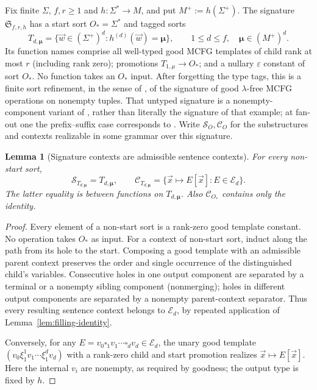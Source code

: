 \documentclass[11pt]{article}
\numberwithin{equation}{section}
\theoremstyle{plain}
\newtheorem{lemma}[theorem]{Lemma}
\theoremstyle{definition}
\theoremstyle{remark}
\newcommand{\tuple}[1]{\vec{#1}}
\newcommand{\blank}{\square}
\newcommand{\eps}{\varepsilon}
\theoremstyle{plain}
\begin{document}
Fix finite $\Sigma$, $f,r\ge1$ and
$h:\Sigma^*\to M$, and put $M^+:=h(\Sigma^+)$.
The signature $\mathfrak S_{f,r,h}$ has a
start sort $O_*=\Sigma^*$ and tagged sorts
\[
 T_{d,\boldsymbol\mu}
 =\{\tuple w\in(\Sigma^+)^d:
 h^{(d)}(\tuple w)=\boldsymbol\mu\},
 \qquad
 1\le d\le f,\quad\boldsymbol\mu\in(M^+)^d.
\]
Its function names comprise all well-typed
good MCFG templates of child rank at most $r$
(including rank zero); promotions
$T_{1,\mu}\to O_*$; and a nullary $\eps$
constant of sort $O_*$. No function takes an
$O_*$ input. After forgetting the type tags, this is a
finite sort refinement, in the sense of
\cite[Section~8]{Yoshinaka2015General}, of
the signature of good $\lambda$-free MCFG
operations on nonempty tuples. That
untyped signature is a nonempty-component
variant of \cite[Example~3]{Yoshinaka2015General},
rather than literally the signature of that
example; at fan-out one the prefix--suffix
case corresponds to
\cite[Example~4]{Yoshinaka2015General}.
Write $\mathcal S_O,\mathcal C_O$ for the
substructures and contexts realizable in
some grammar over this signature.

\begin{lemma}[Signature contexts are admissible sentence contexts]
\label{lem:signature-contexts}
For every non-start sort,
\[
 \mathcal S_{T_{d,\boldsymbol\mu}}
 =T_{d,\boldsymbol\mu},
 \qquad
 \mathcal C_{T_{d,\boldsymbol\mu}}
 =\{\tuple x\mapsto E[\tuple x]:E\in\mathcal E_d\}.
\]
The latter equality is between \emph{functions}
on $T_{d,\boldsymbol\mu}$.
Also $\mathcal C_{O_*}$ contains only the identity.
\end{lemma}

\begin{proof}
Every element of a non-start sort is a rank-zero
good template constant. No operation takes
$O_*$ as input. For a context of non-start
sort, induct along the path from its hole
to the start. Composing a good template with
an admissible parent context preserves the
order and single occurrence of the
distinguished child's variables.
Consecutive holes in one output component
are separated by a terminal or a nonempty
sibling component (nonmerging); holes in
different output components are separated
by a nonempty parent-context separator.
Thus every resulting sentence context
belongs to $\mathcal E_d$, by repeated
application of Lemma~\ref{lem:filling-identity}.

Conversely, for any
$E=v_0\blank_1v_1\cdots\blank_dv_d
\in\mathcal E_d$, the unary good template
$(v_0\xi_1^1v_1\cdots\xi_1^dv_d)$
with a rank-zero child and start promotion
realizes $\tuple x\mapsto E[\tuple x]$.
Here the internal $v_i$ are nonempty,
as required by goodness; the output type
is fixed by $h$.
\end{proof}
\end{document}
